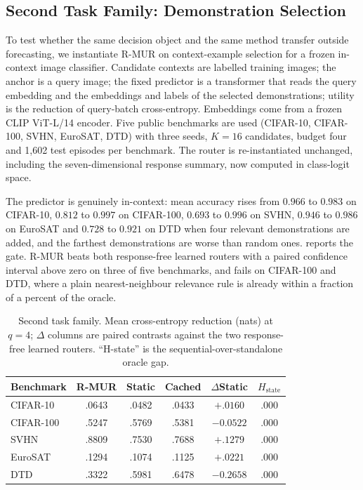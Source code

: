 \subsection{Second Task Family: Demonstration Selection}
\label{sec:second-family}

To test whether the same decision object and the same method transfer outside
forecasting, we instantiate R-MUR on context-example selection for a frozen
in-context image classifier. Candidate contexts are labelled training images;
the anchor is a query image; the fixed predictor is a transformer that reads
the query embedding and the embeddings and labels of the selected
demonstrations; utility is the reduction of query-batch cross-entropy.
Embeddings come from a frozen CLIP ViT-L/14 encoder. Five public benchmarks are
used (CIFAR-10, CIFAR-100, SVHN, EuroSAT, DTD) with three seeds, $K=16$
candidates, budget four and 1{,}602 test episodes per benchmark. The router is
re-instantiated unchanged, including the seven-dimensional response summary,
now computed in class-logit space.

The predictor is genuinely in-context: mean accuracy rises from $0.966$ to
$0.983$ on CIFAR-10, $0.812$ to $0.997$ on CIFAR-100, $0.693$ to $0.996$ on
SVHN, $0.946$ to $0.986$ on EuroSAT and $0.728$ to $0.921$ on DTD when four
relevant demonstrations are added, and the farthest demonstrations are worse
than random ones.  reports the gate. R-MUR beats both
response-free learned routers with a paired confidence interval above zero on
three of five benchmarks, and fails on CIFAR-100 and DTD, where a plain
nearest-neighbour relevance rule is already within a fraction of a percent of
the oracle.

\begin{table}[t]
 \centering
 \small
 \caption{Second task family. Mean cross-entropy reduction (nats) at $q=4$;
 $\Delta$ columns are paired contrasts against the two response-free learned
 routers. ``H-state'' is the sequential-over-standalone oracle gap.}
 \label{tab:second-family}
 \begin{tabular}{lccccc}
  \toprule
  Benchmark & R-MUR & Static & Cached & $\Delta$Static & $H_{\mathrm{state}}$\\
  \midrule
  CIFAR-10 & .0643 & .0482 & .0433 & $+.0160$ & .000\\
  CIFAR-100 & .5247 & .5769 & .5381 & $-0.0522$ & .000\\
  SVHN & .8809 & .7530 & .7688 & $+.1279$ & .000\\
  EuroSAT & .1294 & .1074 & .1125 & $+.0221$ & .000\\
  DTD & .3322 & .5981 & .6478 & $-0.2658$ & .000\\
  \bottomrule
 \end{tabular}
\end{table}

